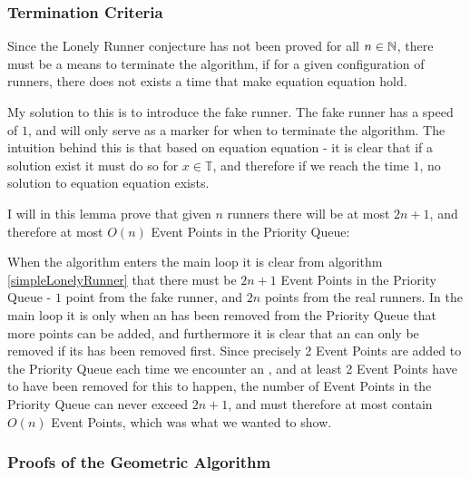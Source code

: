 \subsubsection{Termination Criteria}
\label{termination}
Since the Lonely Runner conjecture has not been proved for all $n \in \mathbb{N}$, there must be a means to terminate the algorithm, if for a given configuration of runners, there does not exists a time that make equation equation  hold.

My solution to this is to introduce the fake runner. The fake runner has a speed of $1$, and will only serve as a marker for when to terminate the algorithm. The intuition behind this is that based on equation equation  - it is clear that if a solution exist it must do so for $x \in \mathbb{T}$, and therefore if we reach the time $1$, no solution to equation equation  exists.

\begin{lemma}
\label{maximum_event_points}
I will in this lemma prove that given $n$ runners there will be at most $2n + 1$, and therefore at most $O(n)$ Event Points in the Priority Queue:

When the algorithm enters the main loop it is clear from algorithm \ref{simpleLonelyRunner} that there must be $2n + 1$ Event Points in the Priority Queue - $1$ point from the fake runner, and $2n$ points from the real runners. In the main loop it is only when an \comEnd has been removed from the Priority Queue that more points can be added, and furthermore it is clear that an \comEnd can only be removed if its \comStart has been removed first. Since precisely 2 Event Points are added to the Priority Queue each time we encounter an \comEnd, and at least 2 Event Points have to have been removed for this to happen, the number of Event Points in the Priority Queue can never exceed $2n + 1$, and must therefore at most contain $O(n)$ Event Points, which was what we wanted to show.
\end{lemma}

\subsubsection{Proofs of the Geometric Algorithm}
\label{proof_geo}

